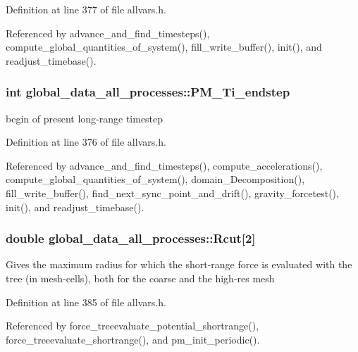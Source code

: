 Definition at line 377 of file allvars.h.



Referenced by advance\_\-and\_\-find\_\-timesteps(), compute\_\-global\_\-quantities\_\-of\_\-system(), fill\_\-write\_\-buffer(), init(), and readjust\_\-timebase().

\hypertarget{structglobal__data__all__processes_a723a0aa2f2ac0ac4cc58ebc049dda9b3}{
\subsubsection[{PM\_\-Ti\_\-endstep}]{\setlength{\rightskip}{0pt plus 5cm}int {\bf global\_\-data\_\-all\_\-processes::PM\_\-Ti\_\-endstep}}}
\label{structglobal__data__all__processes_a723a0aa2f2ac0ac4cc58ebc049dda9b3}
begin of present long-\/range timestep 

Definition at line 376 of file allvars.h.



Referenced by advance\_\-and\_\-find\_\-timesteps(), compute\_\-accelerations(), compute\_\-global\_\-quantities\_\-of\_\-system(), domain\_\-Decomposition(), fill\_\-write\_\-buffer(), find\_\-next\_\-sync\_\-point\_\-and\_\-drift(), gravity\_\-forcetest(), init(), and readjust\_\-timebase().

\hypertarget{structglobal__data__all__processes_aeb7ceb2f4d86465e1febbfad5fa849d6}{
\subsubsection[{Rcut}]{\setlength{\rightskip}{0pt plus 5cm}double {\bf global\_\-data\_\-all\_\-processes::Rcut}\mbox{[}2\mbox{]}}}
\label{structglobal__data__all__processes_aeb7ceb2f4d86465e1febbfad5fa849d6}
Gives the maximum radius for which the short-\/range force is evaluated with the tree (in mesh-\/cells), both for the coarse and the high-\/res mesh 

Definition at line 385 of file allvars.h.



Referenced by force\_\-treeevaluate\_\-potential\_\-shortrange(), force\_\-treeevaluate\_\-shortrange(), and pm\_\-init\_\-periodic().

